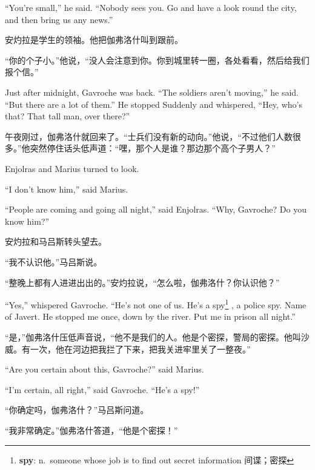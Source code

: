 \documentclass[fontset=ubuntu, zihao=5]{ctexart}
\begin{document}
\begin{paracol}{2}
``You're small,'' he said. ``Nobody sees you. Go and have a look round the city, and then bring us any news.''

\switchcolumn

安灼拉是学生的领袖。他把伽弗洛什叫到跟前。

“你的个子小。”他说，“没人会注意到你。你到城里转一圈，各处看看，然后给我们报个信。”

\switchcolumn*

Just after midnight, Gavroche was back. ``The soldiers aren't moving,'' he said. ``But there are a lot of them.'' He stopped Suddenly and whispered, ``Hey, who's that? That tall man, over there?''


\switchcolumn

午夜刚过，伽弗洛什就回来了。“士兵们没有新的动向。”他说，“不过他们人数很多。”他突然停住话头低声道：“嘿，那个人是谁？那边那个高个子男人？”

\switchcolumn*

Enjolras and Marius turned to look.

``I don't know him,'' said Marius.

``People are coming and going all night,'' said Enjolras. ``Why, Gavroche? Do you know him?''

\switchcolumn

安灼拉和马吕斯转头望去。

“我不认识他。”马吕斯说。

“整晚上都有人进进出出的。”安灼拉说，“怎么啦，伽弗洛什？你认识他？”

\switchcolumn*

``Yes,'' whispered Gavroche. ``He's not one of us. He's a
spy\footnote{\textbf{spy}: n. someone whose job is to find out secret
  information 间谍；密探} , a police spy. Name of Javert. He stopped me
once, down by the river. Put me in prison all night.''

\switchcolumn

“是，”伽弗洛什压低声音说，“他不是我们的人。他是个密探，警局的密探。他叫沙威。有一次，他在河边把我拦了下来，把我关进牢里关了一整夜。”

\switchcolumn*

``Are you certain about this, Gavroche?'' said Marius.

``I'm certain, all right,'' said Gavroche. ``He's a spy!''

\switchcolumn

“你确定吗，伽弗洛什？”马吕斯问道。

“我非常确定。”伽弗洛什答道，“他是个密探！”


\end{paracol}
\end{document}
